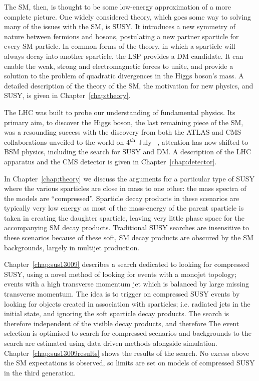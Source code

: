 The \ac{SM}, then, is thought to be some low-energy approximation of a more complete picture.
One widely considered theory, which goes some way to solving many of the issues with the \ac{SM}, is \ac{SUSY}.
It introduces a new symmetry of nature between fermions and bosons, postulating a new partner sparticle for every \ac{SM} particle. 
In common forms of the theory, in which a sparticle will always decay into another sparticle, the \ac{LSP} provides a \ac{DM} candidate. 
It can enable the weak, strong and electromagnetic forces to unite, and provide a solution to the problem of quadratic divergences in the Higgs boson's mass. 
A detailed description of the theory of the \ac{SM}, the motivation for new physics, and \ac{SUSY}, is given in Chapter~\ref{chap:theory}.

The LHC was built to probe our understanding of fundamental physics. 
Its primary aim, to discover the Higgs boson, the last remaining piece of the \ac{SM}, was a resounding success with the discovery  from both the \ac{ATLAS} and \ac{CMS} collaborations unveiled to the world on 4$^{\rm th}$ July ~\cite{Aad:2012tfa,Chatrchyan:2012ufa},   
 attention has now shifted to \ac{BSM} physics, including the search for \ac{SUSY} and \ac{DM}. 
A description of the LHC apparatus and the \ac{CMS} detector is given in Chapter~\ref{chap:detector}.

In Chapter~\ref{chap:theory} we discuss the arguments for a particular type of \ac{SUSY} where the various sparticles are close in mass to one other: the mass spectra of the models are ``compressed''. 
Sparticle decay products in these scenarios are typically very low energy as most of the mass-energy of the parent sparticle is taken in creating the daughter sparticle, leaving very little phase space for the accompanying \ac{SM} decay products.
Traditional \ac{SUSY} searches are insensitive to these scenarios because of these soft, \ac{SM} decay products are obscured by the \ac{SM} backgrounds, largely in multijet production. 

Chapter~\ref{chap:sus13009} describes a search dedicated to looking for compressed \ac{SUSY}, using a novel method of looking for events with a monojet topology; events with a high transverse momentum jet which is balanced by large missing transverse momentum. 
The idea is to trigger on compressed \ac{SUSY} events by looking for objects created in association with sparticles; i.e. radiated jets in the initial state, and ignoring the soft sparticle decay products.
The search is therefore independent of the visible decay products, and therefore  
The event selection is optimised to search for compressed scenarios and backgrounds to the search are estimated using data driven methods alongside simulation.
Chapter~\ref{chap:sus13009results} shows the results of the search. No excess above the \ac{SM} expectations is observed, so limits are set on models of compressed \ac{SUSY} in the third generation.


